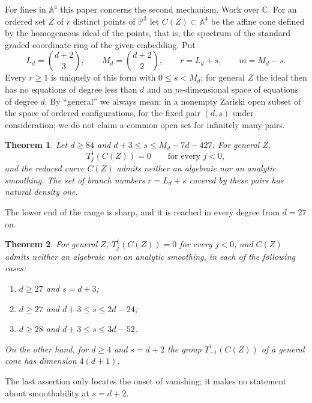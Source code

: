 \documentclass{amsart}
\newtheorem{theorem}{Theorem}[section]
\theoremstyle{definition}
\theoremstyle{remark}
\numberwithin{equation}{section}
\newcommand{\CC}{\mathbb{C}}
\newcommand{\PP}{\mathbb{P}}
\newcommand{\A}{\mathbb{A}}
\begin{document}
For lines in $\A^4$ this paper concerns the second mechanism. Work over $\CC$. For an ordered
set $Z$ of $r$ distinct points of $\PP^3$ let $C(Z)\subset\A^4$ be the affine cone defined by
the homogeneous ideal of the points, that is, the spectrum of the standard graded coordinate
ring of the given embedding. Put
\begin{equation}\label{eq:LM}
  L_d=\binom{d+2}3,\qquad M_d=\binom{d+2}2,\qquad r=L_d+s,\qquad m=M_d-s .
\end{equation}
Every $r\ge1$ is uniquely of this form with $0\le s<M_d$; for general $Z$ the ideal then
has no equations of degree less than $d$ and an $m$-dimensional space of equations of degree
$d$. By ``general'' we always mean: in a nonempty Zariski open subset of the space of ordered
configurations, for the fixed pair $(d,s)$ under consideration; we do not claim a common
open set for infinitely many pairs.

\begin{theorem}\label{thm:main}
Let $d\ge84$ and $d+3\le s\le M_d-7d-427$. For general $Z$,
\[
  T^1_j(C(Z))=0\qquad\text{for every }j<0,
\]
and the reduced curve $C(Z)$ admits neither an algebraic nor an analytic smoothing. The set
of branch numbers $r=L_d+s$ covered by these pairs has natural density one.
\end{theorem}

The lower end of the range is sharp, and it is reached in every degree from $d=27$ on.

\begin{theorem}\label{thm:lower}
For general $Z$, $T^1_j(C(Z))=0$ for every $j<0$, and $C(Z)$ admits neither an algebraic
nor an analytic smoothing, in each of the following cases:
\begin{enumerate}[label=\textup{(\alph*)}]
\item $d\ge27$ and $s=d+3$;
\item $d\ge27$ and $d+3\le s\le2d-24$;
\item $d\ge28$ and $d+3\le s\le3d-52$.
\end{enumerate}
On the other hand, for $d\ge4$ and $s=d+2$ the group $T^1_{-1}(C(Z))$ of a general cone has
dimension $4(d+1)$.
\end{theorem}

The last assertion only locates the onset of vanishing; it makes no statement about
smoothability at $s=d+2$.
\end{document}

